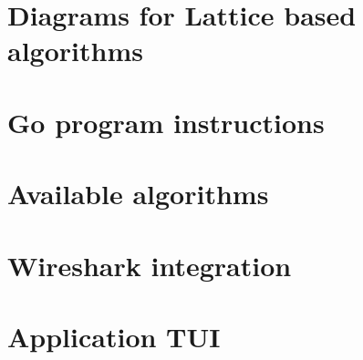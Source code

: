 \chapter{Diagrams for Lattice based algorithms}
\label{ch:block_diagrams}


\chapter{Go program instructions}
\label{ch:go_instructions}


\chapter{Available algorithms}
\label{ch:available_algs}


\chapter{Wireshark integration}
\label{ch:wireshark}


\chapter{Application TUI}
\label{ch:TUI_example}

